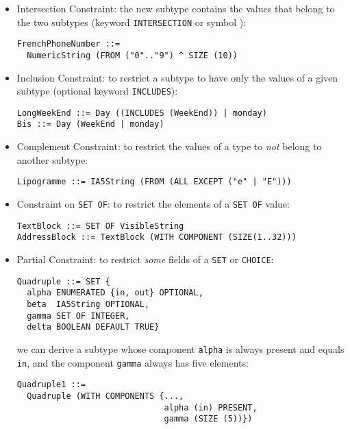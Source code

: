 \documentclass[12pt]{article}
\begin{document}
\begin{slide}
\begin{itemize}
  \item \textsf{Intersection Constraint}: the new subtype contains the
        values that belong to the two subtypes (keyword
        \texttt{INTERSECTION} or symbol \texttt{}):

\begin{verbatim}
FrenchPhoneNumber ::= 
  NumericString (FROM ("0".."9") ^ SIZE (10))
\end{verbatim}

\bigskip\bigskip

  \item \textsf{Inclusion Constraint}: to restrict a subtype to have
        only the values of a given subtype (optional keyword
        \texttt{INCLUDES}):

\begin{verbatim}
LongWeekEnd ::= Day ((INCLUDES (WeekEnd)) | monday)
Bis ::= Day (WeekEnd | monday)
\end{verbatim}

\pagebreak

  \item \textsf{Complement Constraint}: to restrict the values of a
        type to \emph{not} belong to another subtype:

\begin{verbatim}
Lipogramme ::= IA5String (FROM (ALL EXCEPT ("e" | "E")))
\end{verbatim}

\bigskip\bigskip

  \item \textsf{Constraint on \texttt{SET OF}}: to restrict the
        elements of a \texttt{SET OF} value:

\begin{verbatim}
TextBlock ::= SET OF VisibleString
AddressBlock ::= TextBlock (WITH COMPONENT (SIZE(1..32)))
\end{verbatim}

\pagebreak

  \item \textsf{Partial Constraint}: to restrict \emph{some} fields
        of a \texttt{SET} or \texttt{CHOICE}:

\begin{verbatim}
Quadruple ::= SET {
  alpha ENUMERATED {in, out} OPTIONAL,
  beta  IA5String OPTIONAL,
  gamma SET OF INTEGER,
  delta BOOLEAN DEFAULT TRUE}
\end{verbatim}

we can derive a subtype whose component \verb+alpha+ is always present
and equals \verb+in+, and the component \verb+gamma+ always has
five elements:
\begin{verbatim}
Quadruple1 ::=
  Quadruple (WITH COMPONENTS {..., 
                              alpha (in) PRESENT,  
                              gamma (SIZE (5))})
\end{verbatim}


\end{itemize}
\end{slide}
\end{document}
